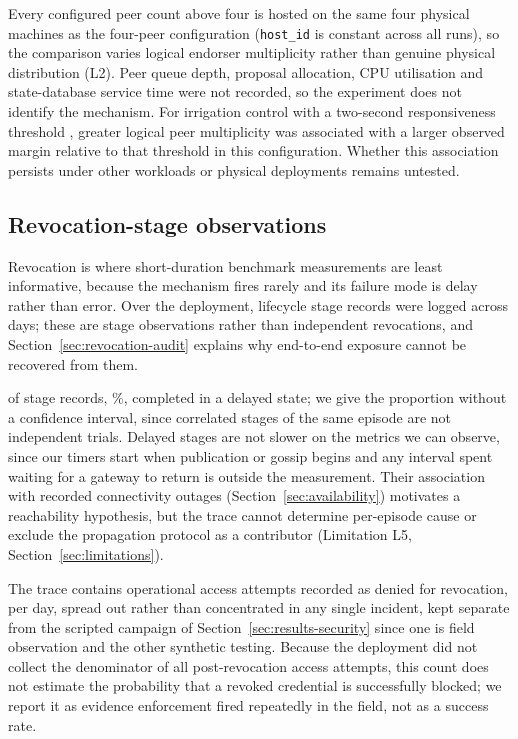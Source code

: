 Every configured peer count above four is hosted on the same four physical machines as the four-peer configuration (\texttt{host\_id} is constant across all \PeerRunsTotal{} runs), so the comparison varies logical endorser multiplicity rather than genuine physical distribution (L2). Peer queue depth, proposal allocation, CPU utilisation and state-database service time were not recorded, so the experiment does not identify the mechanism. For irrigation control with a two-second responsiveness threshold \citep{leacox2013lowcost}, greater logical peer multiplicity was associated with a larger observed margin relative to that threshold in this configuration. Whether this association persists under other workloads or physical deployments remains untested.

\subsection{Revocation-stage observations}
\label{sec:revocation-results}

Revocation is where short-duration benchmark measurements are least informative, because the mechanism fires rarely and its failure mode is delay rather than error. Over the deployment, \RevocationStageRecords{} lifecycle stage records were logged across \RevocationTraceSpanDays{} days; these are stage observations rather than independent revocations, and Section~\ref{sec:revocation-audit} explains why end-to-end exposure cannot be recovered from them.

\RevocationDelayedCount{} of \RevocationStageRecords{} stage records, \RevocationDelayedPct\%, completed in a delayed state; we give the proportion without a confidence interval, since correlated stages of the same episode are not independent trials. Delayed stages are not slower on the metrics we can observe, since our timers start when publication or gossip begins and any interval spent waiting for a gateway to return is outside the measurement. Their association with recorded connectivity outages (Section~\ref{sec:availability}) motivates a reachability hypothesis, but the trace cannot determine per-episode cause or exclude the propagation protocol as a contributor (Limitation L5, Section~\ref{sec:limitations}).

The trace contains \FieldRevocationDenials{} operational access attempts recorded as denied for revocation, \FieldRevocationPerDay{} per day, spread out rather than concentrated in any single incident, kept separate from the scripted campaign of Section~\ref{sec:results-security} since one is field observation and the other synthetic testing. Because the deployment did not collect the denominator of all post-revocation access attempts, this count does not estimate the probability that a revoked credential is successfully blocked; we report it as evidence enforcement fired repeatedly in the field, not as a success rate.

